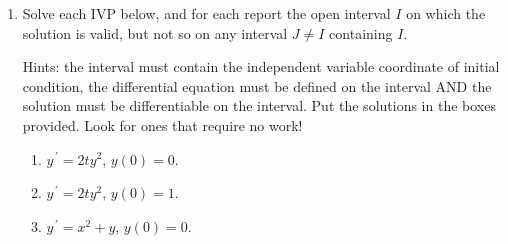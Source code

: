 \documentclass{ximera}
\begin{document}
\begin{enumerate}
\begin{enumerate}
\vfill

\hfill{}


\end{enumerate}

\newpage

\item Solve each IVP below, and for each report the open interval $I$ on which the solution is valid, but not so on any interval $J\neq I$ containing $I$. 
    
    Hints: the interval must contain the independent variable coordinate of initial condition, the differential equation must be defined on the interval AND the solution must be differentiable on the interval.  Put the solutions in the boxes provided.  Look for ones that require no work!

\begin{enumerate}

\item $y^{\,\prime}=2ty^2$, $y(0)=0$.

\vfill

\hfill{}



\item $y^{\,\prime}=2ty^2$, $y(0)=1$.

\vfill

\hfill{}



\newpage

\item $y^{\,\prime}=x^2+y$, $y(0)=0$.

\vfill

\hfill{}




\end{enumerate}
\end{enumerate}
\end{document}
